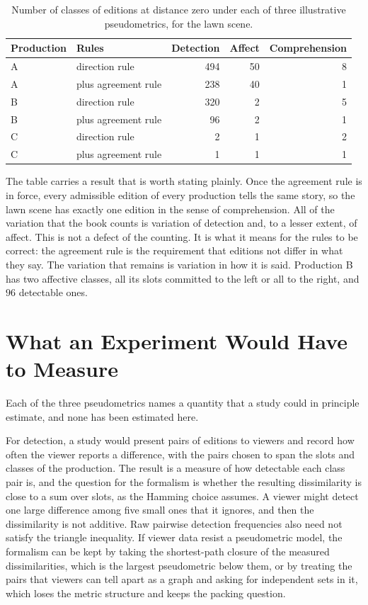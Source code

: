 \documentclass[11pt,twoside,openright]{book}
\theoremstyle{plain}
\theoremstyle{definition}
\theoremstyle{remark}
\begin{document}
\begin{table}[ht]
\centering
\begin{tabular}{@{}llrrr@{}}
\toprule
Production & Rules & Detection & Affect & Comprehension\\
\midrule
A & direction rule & 494 & 50 & 8\\
A & plus agreement rule & 238 & 40 & 1\\
B & direction rule & 320 & 2 & 5\\
B & plus agreement rule & 96 & 2 & 1\\
C & direction rule & 2 & 1 & 2\\
C & plus agreement rule & 1 & 1 & 1\\
\bottomrule
\end{tabular}
\caption{Number of classes of editions at distance zero under each of three illustrative pseudometrics, for the lawn scene.}\label{tab:notions}
\end{table}

The table carries a result that is worth stating plainly. Once the agreement rule is in force, every admissible edition of every production tells the same story, so the lawn scene has exactly one edition in the sense of comprehension. All of the variation that the book counts is variation of detection and, to a lesser extent, of affect. This is not a defect of the counting. It is what it means for the rules to be correct: the agreement rule is the requirement that editions not differ in what they say. The variation that remains is variation in how it is said. Production B has two affective classes, all its slots committed to the left or all to the right, and $96$ detectable ones.

\section{What an Experiment Would Have to Measure}\label{sec:experiment}

Each of the three pseudometrics names a quantity that a study could in principle estimate, and none has been estimated here.

For detection, a study would present pairs of editions to viewers and record how often the viewer reports a difference, with the pairs chosen to span the slots and classes of the production. The result is a measure of how detectable each class pair is, and the question for the formalism is whether the resulting dissimilarity is close to a sum over slots, as the Hamming choice assumes. A viewer might detect one large difference among five small ones that it ignores, and then the dissimilarity is not additive. Raw pairwise detection frequencies also need not satisfy the triangle inequality. If viewer data resist a pseudometric model, the formalism can be kept by taking the shortest-path closure of the measured dissimilarities, which is the largest pseudometric below them, or by treating the pairs that viewers can tell apart as a graph and asking for independent sets in it, which loses the metric structure and keeps the packing question.
\end{document}
